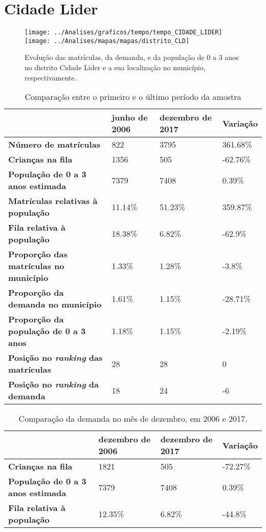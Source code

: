 \section{Cidade Lider}
\begin{figure}[H]
\centering
\texttt{[image: ../Analises/graficos/tempo/tempo\_CIDADE\_LIDER]}
\texttt{[image: ../Analises/mapas/mapas/distrito\_CLD]}
\caption{Evolução das matrículas, da demanda, e da população de 0 a 3 anos no distrito Cidade Lider e a sua localização no município, respectivamente.}
\end{figure}
\begin{table}[H]
\begin{tabular}{l|l|l|l}
\textbf{}                                      & \textbf{junho de 2006}       & \textbf{dezembro de 2017}    & \textbf{Variação} \\ \hline
\textbf{Número de matrículas}                  & 822 & 3795 & 361.68\% \\ \hline
\textbf{Crianças na fila}                      & 1356 & 505 & -62.76\% \\ \hline
\textbf{População de 0 a 3 anos estimada}      & 7379 & 7408 & 0.39\% \\ \hline
\textbf{Matrículas relativas à população}      & 11.14\% & 51.23\% & 359.87\% \\ \hline
\textbf{Fila relativa à população}             & 18.38\% & 6.82\% & -62.9\% \\ \hline
\textbf{Proporção das matrículas no município} & 1.33\% & 1.28\% & -3.8\% \\ \hline
\textbf{Proporção da demanda no município}     & 1.61\% & 1.15\% & -28.71\% \\ \hline
\textbf{Proporção da população de 0 a 3 anos}  & 1.18\% & 1.15\% & -2.19\% \\ \hline
\textbf{Posição no \textit{ranking} das matrículas}     & 28 & 28 & 0 \\ \hline
\textbf{Posição no \textit{ranking} da demanda}         & 18 & 24 & -6 \\ 
\end{tabular}
\caption{Comparação entre o primeiro e o último período da amostra}
\end{table}
\begin{table}[H]
\begin{tabular}{l|l|l|l}
\textbf{}                                 & \textbf{dezembro de 2006} & \textbf{dezembro de 2017} & \textbf{Variação} \\ \hline
\textbf{Crianças na fila}                      & 1821 & 505 & -72.27\% \\ \hline
\textbf{População de 0 a 3 anos estimada}      & 7379 & 7408 & 0.39\% \\ \hline
\textbf{Fila relativa à população}             & 12.35\% & 6.82\% & -44.8\% \\
\end{tabular}
\caption{Comparação da demanda no mês de dezembro, em 2006 e 2017.}
\end{table}
